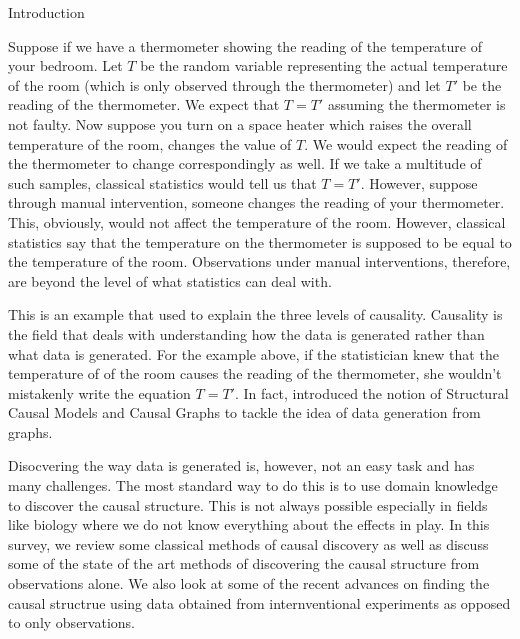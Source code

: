\documentclass[10pt]{article}
\begin{document}
\begin{psection}{Introduction}

    Suppose if we have a thermometer showing the reading of the temperature of your
    bedroom.  Let $T$ be the random variable representing the actual temperature of the
    room (which is only observed through the thermometer) and let $T'$ be the reading of
    the thermometer.  We expect that $T = T'$ assuming the thermometer is not faulty.
    Now suppose you turn on a space heater which raises the overall temperature of the
    room, \ie changes the value of $T$. We would expect the reading of the thermometer
    to change correspondingly as well.  If we take a multitude of such samples,
    classical statistics would tell us that $T = T'$.  However, suppose through manual
    intervention, someone changes the reading of your thermometer. This, obviously,
    would not affect the temperature of the room.  However, classical statistics say
    that the temperature on the thermometer is supposed to be equal to the temperature
    of the room. Observations under manual interventions, therefore, are beyond the
    level of what statistics can deal with.

    This is an example that \citet{pearl2000} used to explain the three levels of
    causality.  Causality is the field that deals with understanding how the data is
    generated rather than what data is generated. For the example above, if the
    statistician knew that the temperature of of the room causes the reading of the
    thermometer, she wouldn't mistakenly write the equation $T = T'$.  In fact,
    \citet{pearl1995, pearl2000} introduced the notion of Structural Causal Models and
    Causal Graphs to tackle the idea of data generation from graphs.

    Disocvering the way data is generated is, however, not an easy task and has many
    challenges. The most standard way to do this is to use domain knowledge to discover
    the causal structure. This is not always possible especially in fields like biology
    where we do not know everything about the effects in play. In this survey, we review
    some classical methods of causal discovery as well as discuss some of the state of
    the art methods of discovering the causal structure from observations alone. We also
    look at some of the recent advances on finding the causal structrue using data
    obtained from internventional experiments as opposed to only observations.


\end{psection}
\end{document}
